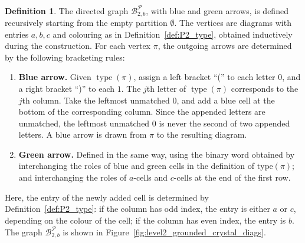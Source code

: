 \documentclass[11pt]{article}
\theoremstyle{definition}
\newtheorem{definition}[theorem]{Definition}
\theoremstyle{remark}
\theoremstyle{definition}
\numberwithin{equation}{section}
\newcommand{\type}{\operatorname{type}}
\begin{document}
\begin{definition}\label{def:P2_crystal}
  The directed graph \(\mathcal{B}_{2,b}^{\mathcal{P}}\), with blue
  and green arrows, is defined recursively starting from the empty
  partition \( \emptyset \). The vertices are diagrams with entries
  \( a,b,c \) and colouring as in Definition~\ref{def:P2_type},
  obtained inductively during the construction. For each vertex
  \(\pi\), the outgoing arrows are determined by the following
  bracketing rules:
\begin{enumerate}
\item \textbf{Blue arrow.} Given \( \type(\pi) \), assign a left
  bracket ``('' to each letter \( 0 \), and a right bracket ``)'' to
  each \( 1 \). The \( j \)th letter of \( \type(\pi) \) corresponds
  to the \( j \)th column. Take the leftmost unmatched \( 0 \), and
  add a blue cell at the bottom of the corresponding column. Since the
  appended letters are unmatched, the leftmost unmatched \( 0 \) is
  never the second of two appended letters. A blue arrow is drawn from
  $\pi$ to the resulting diagram.
\item \textbf{Green arrow.} Defined in the same way, using the binary
  word obtained by interchanging the roles of blue and green cells in
  the definition of \(\mathrm{type}(\pi)\); and interchanging the
  roles of \(a\)-cells and \(c\)-cells at the end of the first row.
\end{enumerate}
Here, the entry of the newly added cell is determined by
Definition~\ref{def:P2_type}: if the column has odd index, the entry
is either \(a\) or \(c\), depending on the colour of the cell; if the
column has even index, the entry is \( b \). The graph
\( \mathcal{B}_{2,b}^{\mathcal{P}} \) is shown in
Figure~\ref{fig:level2_grounded_crystal_diags}.
\end{definition}
\end{document}
